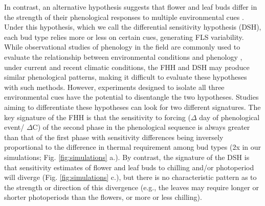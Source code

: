 \documentclass[11pt]{article}\usepackage[]{graphicx}\usepackage[]{color}
\begin{document}
\noindent In contrast, an alternative hypothesis suggests that flower and leaf buds differ in the strength of their phenological responses to multiple environmental cues \citep{Citadin2001,Gariglio2006,Aslani2009,Mehlenbacher:1991aa}. Under this hypothesis, which we call the differential sensitivity hypothesis (DSH), each bud type relies more or less on certain cues, generating FLS variability.\\ %


\noindent While observational studies of phenology in the field are commonly used to evaluate the relationship between environmental conditions and phenology \citep{Cleland2007}, under current and recent climatic conditions, the FHH and DSH may produce similar phenological patterns, making it difficult to evaluate these hypotheses with such methods. However, experiments designed to isolate all three environmental cues have the potential to disentangle the two hypotheses. Studies aiming to differentiate these hypotheses can look for two different signatures. The key signature of the FHH is that the sensitivity to forcing ($\Delta$ day of phenological event/ $\Delta$\degree C) of the second phase in the phenological sequence is always greater than that of the first phase with sensitivity differences being inversely proportional to the difference in thermal requirement among bud types (2x in our simulations; Fig. \ref{fig:simulations} a.). By contrast, the signature of the DSH is that sensitivity estimates of flower and leaf buds to chilling and/or photoperiod will diverge (Fig. \ref{fig:simulations} c.), but there is no characteristic pattern as to the strength or direction of this divergence (e.g., the leaves may require longer or shorter photoperiods than the flowers, or more or less chilling).\\
\end{document}
